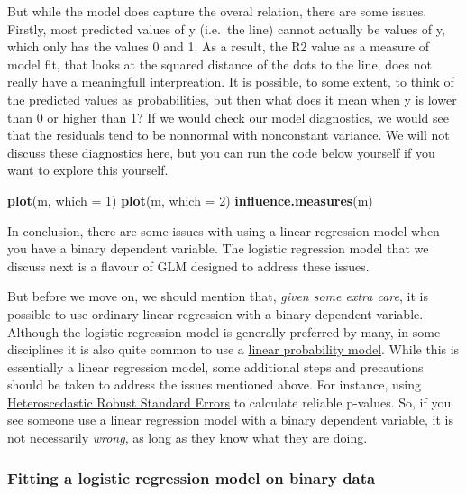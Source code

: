 \documentclass[
]{article}
\newenvironment{Shaded}{\begin{snugshade}}{\end{snugshade}}
\newcommand{\DataTypeTok}[1]{\textcolor[rgb]{0.13,0.29,0.53}{#1}}
\newcommand{\DecValTok}[1]{\textcolor[rgb]{0.00,0.00,0.81}{#1}}
\newcommand{\KeywordTok}[1]{\textcolor[rgb]{0.13,0.29,0.53}{\textbf{#1}}}
\newcommand{\NormalTok}[1]{#1}
\begin{document}
But while the model does capture the overal relation, there are some
issues. Firstly, most predicted values of y (i.e.~the line) cannot
actually be values of y, which only has the values 0 and 1. As a result,
the R2 value as a measure of model fit, that looks at the squared
distance of the dots to the line, does not really have a meaningfull
interpreation. It is possible, to some extent, to think of the predicted
values as probabilities, but then what does it mean when y is lower than
0 or higher than 1? If we would check our model diagnostics, we would
see that the residuals tend to be nonnormal with nonconstant variance.
We will not discuss these diagnostics here, but you can run the code
below yourself if you want to explore this yourself.

\begin{Shaded}
\begin{Highlighting}[]
\KeywordTok{plot}\NormalTok{(m, }\DataTypeTok{which =} \DecValTok{1}\NormalTok{)}
\KeywordTok{plot}\NormalTok{(m, }\DataTypeTok{which =} \DecValTok{2}\NormalTok{)}
\KeywordTok{influence.measures}\NormalTok{(m)}
\end{Highlighting}
\end{Shaded}

In conclusion, there are some issues with using a linear regression
model when you have a binary dependent variable. The logistic regression
model that we discuss next is a flavour of GLM designed to address these
issues.

But before we move on, we should mention that, \emph{given some extra
care}, it is possible to use ordinary linear regression with a binary
dependent variable. Although the logistic regression model is generally
preferred by many, in some disciplines it is also quite common to use a
\href{https://en.wikipedia.org/wiki/Linear_probability_model}{linear
probability model}. While this is essentially a linear regression model,
some additional steps and precautions should be taken to address the
issues mentioned above. For instance, using
\href{https://www.r-econometrics.com/methods/hcrobusterrors/}{Heteroscedastic
Robust Standard Errors} to calculate reliable p-values. So, if you see
someone use a linear regression model with a binary dependent variable,
it is not necessarily \emph{wrong}, as long as they know what they are
doing.

\hypertarget{fitting-a-logistic-regression-model-on-binary-data}{%
\subsubsection{Fitting a logistic regression model on binary
data}\label{fitting-a-logistic-regression-model-on-binary-data}}
\end{document}
